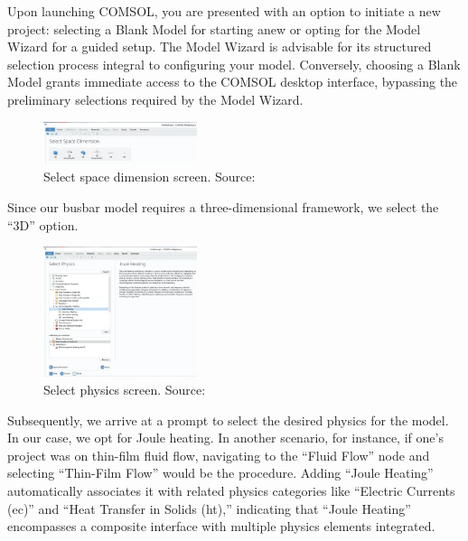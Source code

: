 Upon launching COMSOL, you are presented with an option to initiate a new project: selecting a Blank Model for starting anew or opting for the Model Wizard for a guided setup. The Model Wizard is advisable for its structured selection process integral to configuring your model. Conversely, choosing a Blank Model grants immediate access to the COMSOL desktop interface, bypassing the preliminary selections required by the Model Wizard.

\begin{figure}[ht!]
  \centering
  \includegraphics[width=0.4\textwidth]{Chapters/Figures/Chapter 3 Figures/Select Space Dimension.png}
  \caption{Select space dimension screen. Source: \cite{multiphysics__modeling_nodate}}
  \label{fig:Select Space Dimension}
\end{figure}

Since our busbar model requires a three-dimensional framework, we select the ``3D'' option.

\begin{figure}[ht!]
  \centering
  \includegraphics[width=0.4\textwidth]{Chapters/Figures/Chapter 3 Figures/Select Physics.png}
  \caption{Select physics screen. Source: \cite{multiphysics__modeling_nodate}}
  \label{fig:Select Physics}
\end{figure}

Subsequently, we arrive at a prompt to select the desired physics for the model. In our case, we opt for Joule heating. In another scenario, for instance, if one's project was on thin-film fluid flow, navigating to the ``Fluid Flow'' node and selecting ``Thin-Film Flow'' would be the procedure. Adding ``Joule Heating'' automatically associates it with related physics categories like ``Electric Currents (ec)'' and ``Heat Transfer in Solids (ht),'' indicating that ``Joule Heating'' encompasses a composite interface with multiple physics elements integrated.


